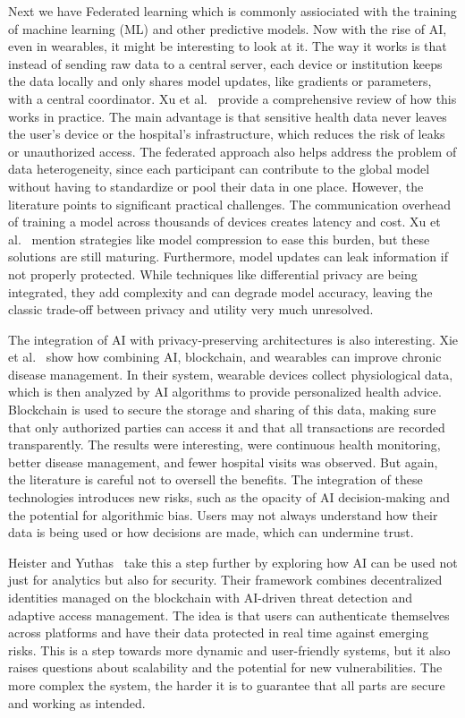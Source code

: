 	Next we have Federated learning which is commonly assiociated with the training of machine learning (ML) and other predictive models. Now with the rise of AI, even in wearables, it might be interesting to look at it. The way it works is that instead of sending raw data to a central server, each device or institution keeps the data locally and only shares model updates, like gradients or parameters, with a central coordinator. Xu et al.~\cite{Xu2021} provide a comprehensive review of how this works in practice. The main advantage is that sensitive health data never leaves the user’s device or the hospital’s infrastructure, which reduces the risk of leaks or unauthorized access. The federated approach also helps address the problem of data heterogeneity, since each participant can contribute to the global model without having to standardize or pool their data in one place. However, the literature points to significant practical challenges. The communication overhead of training a model across thousands of devices creates latency and cost. Xu et al.~\cite{Xu2021} mention strategies like model compression to ease this burden, but these solutions are still maturing. Furthermore, model updates can leak information if not properly protected. While techniques like differential privacy are being integrated, they add complexity and can degrade model accuracy, leaving the classic trade-off between privacy and utility very much unresolved.

	The integration of AI with privacy-preserving architectures is also interesting. Xie et al.~\cite{Xie2021} show how combining AI, blockchain, and wearables can improve chronic disease management. In their system, wearable devices collect physiological data, which is then analyzed by AI algorithms to provide personalized health advice. Blockchain is used to secure the storage and sharing of this data, making sure that only authorized parties can access it and that all transactions are recorded transparently. The results were interesting, were continuous health monitoring, better disease management, and fewer hospital visits was observed. But again, the literature is careful not to oversell the benefits. The integration of these technologies introduces new risks, such as the opacity of AI decision-making and the potential for algorithmic bias. Users may not always understand how their data is being used or how decisions are made, which can undermine trust.

	Heister and Yuthas~\cite{Heister2021} take this a step further by exploring how AI can be used not just for analytics but also for security. Their framework combines decentralized identities managed on the blockchain with AI-driven threat detection and adaptive access management. The idea is that users can authenticate themselves across platforms and have their data protected in real time against emerging risks. This is a step towards more dynamic and user-friendly systems, but it also raises questions about scalability and the potential for new vulnerabilities. The more complex the system, the harder it is to guarantee that all parts are secure and working as intended.

